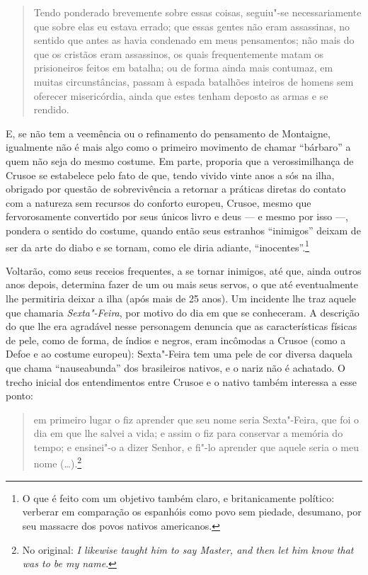 \begin{quote}
Tendo ponderado brevemente sobre essas coisas, seguiu"-se necessariamente
que sobre elas eu estava errado; que essas gentes não eram assassinas,
no sentido que antes as havia condenado em meus pensamentos; não mais do
que os cristãos eram assassinos, os quais frequentemente matam os
prisioneiros feitos em batalha; ou de forma ainda mais contumaz, em
muitas circunstâncias, passam à espada batalhões inteiros de homens sem
oferecer misericórdia, ainda que estes tenham deposto as armas e se
rendido.
\end{quote}

E, se não tem a veemência ou o refinamento do pensamento de Montaigne,
igualmente não é mais algo como o primeiro movimento de chamar
``bárbaro'' a quem não seja do mesmo costume. Em parte, proporia que a
verossimilhança de Crusoe se estabelece pelo fato de que, tendo vivido
vinte anos a sós na ilha, obrigado por questão de sobrevivência a
retornar a práticas diretas do contato com a natureza sem recursos do
conforto europeu, Crusoe, mesmo que fervorosamente convertido por seus
únicos livro e deus --- e mesmo por isso ---, pondera o sentido do
costume, quando então seus estranhos ``inimigos'' deixam de ser da arte
do diabo e se tornam, como ele diria adiante, ``inocentes''.\footnote{O
  que é feito com um objetivo também claro, e britanicamente político:
  verberar em comparação os espanhóis como povo sem piedade, desumano,
  por seu massacre dos povos nativos americanos.}

Voltarão, como seus receios frequentes, a se tornar inimigos, até que,
ainda outros anos depois, determina fazer de um ou mais seus servos, o
que até eventualmente lhe permitiria deixar a ilha (após mais de 25
anos). Um incidente lhe traz aquele que chamaria \emph{Sexta"-Feira}, por
motivo do dia em que se conheceram. A descrição do que lhe era agradável
nesse personagem denuncia que as características físicas de pele, como
de forma, de índios e negros, eram incômodas a Crusoe (como a Defoe e ao
costume europeu): Sexta"-Feira tem uma pele de cor diversa daquela que
chama ``nauseabunda'' dos brasileiros nativos, e o nariz não é achatado.
O trecho inicial dos entendimentos entre Crusoe e o nativo também
interessa a esse ponto:

\begin{quote}
em primeiro lugar o fiz aprender que seu nome seria Sexta"-Feira, que foi
o dia em que lhe salvei a vida; e assim o fiz para conservar a memória
do tempo; e ensinei"-o a dizer Senhor, e fi"-lo aprender que aquele seria
o meu nome (\ldots{}).\footnote{No original: \emph{I likewise taught him to
  say Master, and then let him know that was to be my name}.}
\end{quote}

